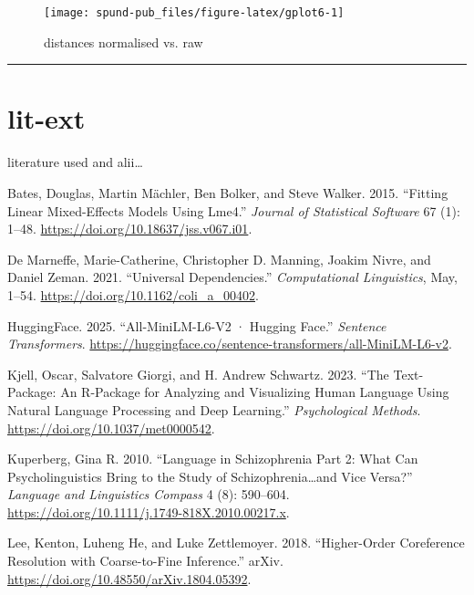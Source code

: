 \documentclass[
  12pt,
  oneside]{book}
\newlength{\cslhangindent}
\newenvironment{CSLReferences}[2] %
 {\begin{list}{}{%
  \setlength{\itemindent}{0pt}
  \setlength{\leftmargin}{0pt}
  \setlength{\parsep}{0pt}
  \ifodd #1
   \setlength{\leftmargin}{\cslhangindent}
   \setlength{\itemindent}{-1\cslhangindent}
  \fi
  \setlength{\itemsep}{#2\baselineskip}}}
 {\end{list}}
\begin{document}
\begin{figure}[H]
\texttt{[image: spund-pub\_files/figure-latex/gplot6-1]} \caption{distances normalised vs. raw}\label{fig:gplot6}
\end{figure}

\begin{center}\rule{0.5\linewidth}{0.5pt}\end{center}

\section{lit-ext}\label{lit-ext}

literature used and alii\ldots{}

\label{refs}
\begin{CSLReferences}{1}{0}
Bates, Douglas, Martin Mächler, Ben Bolker, and Steve Walker. 2015. {``Fitting {Linear} {Mixed}-{Effects} {Models} {Using} Lme4.''} \emph{Journal of Statistical Software} 67 (1): 1--48. \url{https://doi.org/10.18637/jss.v067.i01}.

De Marneffe, Marie-Catherine, Christopher D. Manning, Joakim Nivre, and Daniel Zeman. 2021. {``Universal {Dependencies}.''} \emph{Computational Linguistics}, May, 1--54. \url{https://doi.org/10.1162/coli_a_00402}.

HuggingFace. 2025. {``All-{MiniLM}-{L6}-V2 · {Hugging} {Face}.''} \emph{Sentence Transformers}. \url{https://huggingface.co/sentence-transformers/all-MiniLM-L6-v2}.

Kjell, Oscar, Salvatore Giorgi, and H. Andrew Schwartz. 2023. {``The Text-Package: {An} {R}-Package for {Analyzing} and {Visualizing} {Human} {Language} {Using} {Natural} {Language} {Processing} and {Deep} {Learning}.''} \emph{Psychological Methods}. \url{https://doi.org/10.1037/met0000542}.

Kuperberg, Gina R. 2010. {``Language in Schizophrenia {Part} 2: {What} Can Psycholinguistics Bring to the Study of Schizophrenia\ldots and Vice Versa?''} \emph{Language and Linguistics Compass} 4 (8): 590--604. \url{https://doi.org/10.1111/j.1749-818X.2010.00217.x}.

Lee, Kenton, Luheng He, and Luke Zettlemoyer. 2018. {``Higher-Order {Coreference} {Resolution} with {Coarse}-to-Fine {Inference}.''} arXiv. \url{https://doi.org/10.48550/arXiv.1804.05392}.


\end{CSLReferences}
\end{document}
